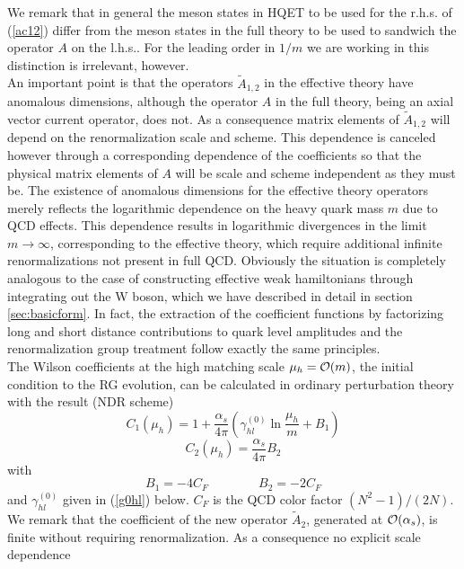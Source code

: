 We remark that in general the meson states in HQET to be used for the
r.h.s. of (\ref{ac12}) differ from the meson states in the full theory
to be used to sandwich the operator $A$ on the l.h.s.. For the leading
order in $1/m$ we are working in this distinction is irrelevant, however.
\\
An important point is that the operators $\tilde A_{1,2}$ in the effective
theory have anomalous dimensions, although the operator $A$ in the full
theory, being an axial vector current operator, does not. As a 
consequence matrix elements of $\tilde A_{1,2}$ will depend on the
renormalization scale and scheme. This dependence is canceled however
through a corresponding dependence of the coefficients so that the physical
matrix elements of $A$ will be scale and scheme independent as they must be.
The existence of anomalous dimensions for the effective theory operators
merely reflects the logarithmic dependence on the heavy quark mass $m$
due to QCD effects. This dependence results in logarithmic divergences in
the limit $m\to\infty$, corresponding to the effective theory, which
require additional infinite renormalizations not present in full QCD.
Obviously the situation is completely analogous to the case of constructing
effective weak hamiltonians through integrating out the W boson, which we
have described in detail in section \ref{sec:basicform}. In fact, the
extraction of the coefficient functions by factorizing long and short
distance contributions to quark level amplitudes and the renormalization
group treatment follow exactly the same principles.
\\
The Wilson coefficients at the high matching scale $\mu_h={\cal O}(m)$,
the initial condition to the RG evolution, can be calculated in
ordinary perturbation theory with the result (NDR scheme)
\begin{equation}\label{c1mh}
C_1(\mu_h)=1+\frac{\alpha_s}{4\pi}\left(\gamma^{(0)}_{hl}\ln\frac{\mu_h}{m}
+B_1\right)
\end{equation}
\begin{equation}\label{c2mh}
C_2(\mu_h)=\frac{\alpha_s}{4\pi} B_2
\end{equation}
with
\begin{equation}\label{b12h}
B_1=-4 C_F\qquad\qquad B_2=-2 C_F
\end{equation}
and $\gamma^{(0)}_{hl}$ given in (\ref{g0hl}) below. $C_F$ is the QCD color
factor $(N^2-1)/(2N)$. We remark that the coefficient of the new
operator $\tilde A_2$, generated at ${\cal O}(\alpha_s)$, is finite without
requiring renormalization. As a consequence no explicit scale dependence
